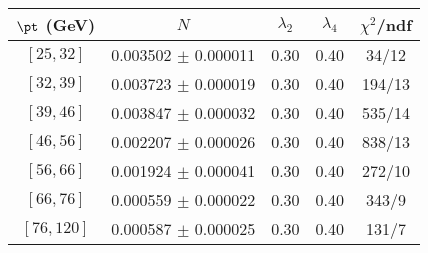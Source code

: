 \begin{tabular}{c||c|c|c|c}
$\pt$ (GeV) & $N$ & $\lambda_{2}$ & $\lambda_4$  & $\chi^2$/ndf  \\
\hline
$[25, 32]$ & 0.003502 $\pm$ 0.000011 & 0.30 & 0.40 & 34/12\\
$[32, 39]$ & 0.003723 $\pm$ 0.000019 & 0.30 & 0.40 & 194/13\\
$[39, 46]$ & 0.003847 $\pm$ 0.000032 & 0.30 & 0.40 & 535/14\\
$[46, 56]$ & 0.002207 $\pm$ 0.000026 & 0.30 & 0.40 & 838/13\\
$[56, 66]$ & 0.001924 $\pm$ 0.000041 & 0.30 & 0.40 & 272/10\\
$[66, 76]$ & 0.000559 $\pm$ 0.000022 & 0.30 & 0.40 & 343/9\\
$[76, 120]$ & 0.000587 $\pm$ 0.000025 & 0.30 & 0.40 & 131/7\\
\end{tabular}

